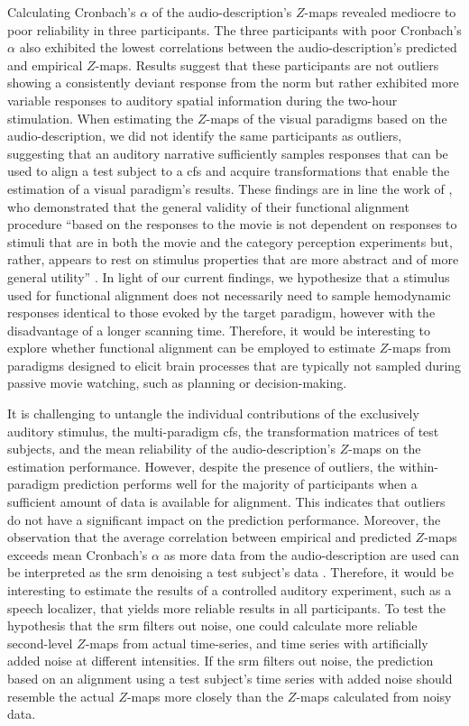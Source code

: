 %
Calculating Cronbach's $\alpha$ of the audio-description's $Z$-maps revealed
mediocre to poor reliability in three participants.
%
The three participants with poor Cronbach's $\alpha$ also exhibited the lowest
correlations between the audio-description's predicted and empirical $Z$-maps.
%
Results suggest that these participants are not outliers showing a consistently
deviant response from the norm but rather exhibited more variable responses to
auditory spatial information during the two-hour stimulation.
%
When estimating the $Z$-maps of the visual paradigms based on the
audio-description, we did not identify the same participants as outliers,
suggesting that an auditory narrative sufficiently samples responses that can be
used to align a test subject to a \ac{cfs} and acquire transformations that
enable the estimation of a visual paradigm's results.
%
These findings are in line the work of \citet{haxby2011common}, who demonstrated
that the general validity of their functional alignment procedure ``based on the
responses to the movie is not dependent on responses to stimuli that are in both
the movie and the category perception experiments but, rather, appears to rest
on stimulus properties that are more abstract and of more general utility''
\citep[][p. 409]{haxby2011common}.
%
In light of our current findings, we hypothesize that a stimulus used for
functional alignment does not necessarily need to sample hemodynamic responses
identical to those evoked by the target paradigm, however with the disadvantage
of a longer scanning time.
%
Therefore, it would be interesting to explore whether functional alignment can
be employed to estimate $Z$-maps from paradigms designed to elicit brain
processes that are typically not sampled during passive movie watching, such as
planning or decision-making.

%
It is challenging to untangle the individual contributions of the exclusively
auditory stimulus, the multi-paradigm \ac{cfs}, the transformation matrices of
test subjects, and the mean reliability of the audio-description's $Z$-maps on
the estimation performance.
%
However, despite the presence of outliers, the within-paradigm prediction
performs well for the majority of participants when a sufficient amount of data
is available for alignment.
%
This indicates that outliers do not have a significant impact on the prediction
performance.
%
Moreover, the observation that the average correlation between empirical and
predicted $Z$-maps exceeds mean Cronbach's $\alpha$ as more data from the
audio-description are used can be interpreted as the \ac{srm} denoising a test
subject's data \citep[cf.][]{chen2015reduced}.
%
Therefore, it would be interesting to estimate the results of a controlled
auditory experiment, such as a speech localizer, that yields more reliable
results in all participants.
%
To test the hypothesis that the \ac{srm} filters out noise, one could calculate
more reliable second-level $Z$-maps from actual time-series, and time series
with artificially added noise at different intensities.
%
If the \ac{srm} filters out noise, the prediction based on an alignment using a
test subject's time series with added noise should resemble the actual $Z$-maps
more closely than the $Z$-maps calculated from noisy data.

